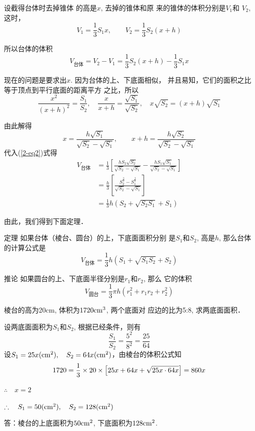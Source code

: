 设截得台体时去掉锥体
的高是$x$, 去掉的锥体和原
来的锥体的体积分别是$V_1$和
$V_2$, 这时，
\[V_1=\frac{1}{3}S_1 x,\qquad V_2=\frac{1}{3}S_2(x+h)\]

所以台体的体积
\begin{equation}\label{2-eq2}
    V_{\text{台体}}=V_2-V_1=\frac{1}{3}S_2(x+h)-\frac{1}{3}S_1x
\end{equation}

现在的问题是要求出$x$. 因为台体的上、下底面相似，
并且易知，它们的面积之比等于顶点到平行底面的距离平方
之比，所以
\[\frac{x^2}{(x+h)^2}=\frac{S_1}{S_2},\quad \frac{x}{x+h}=\frac{\sqrt{S_1}}{\sqrt{S_2}},\quad x\sqrt{S_2}=(x+h)\sqrt{S_1}\]

由此解得
\[x=\frac{h\sqrt{S_1}}{\sqrt{S_2}-\sqrt{S_1}},\qquad x+h=\frac{h\sqrt{S_2}}{\sqrt{S_2}-\sqrt{S_1}}\]
代入(\ref{2-eq2})式得
\[\begin{split}
    V_{\text{台体}}&=\frac{1}{3}\left[\frac{hS_2\sqrt{S_2}}{\sqrt{S_2}-\sqrt{S_1}}-\frac{hS_1\sqrt{S_1}}{\sqrt{S_2}-\sqrt{S_1}}\right]\\
    &=\frac{h}{3}\left[\frac{S_2^{\tfrac{3}{2}}-S_1^{\tfrac{3}{2}}}{\sqrt{S_2}-\sqrt{S_1}}\right]\\
    &=\frac{1}{3}h\left(S_2+\sqrt{S_2S_1}+S_1\right)
\end{split}\]

由此，我们得到下面定理．

\begin{blk}
{定理} 如果台体（棱台、圆台）的上，下底面面积分别
是$S_1$和$S_2$, 高是$h$, 那么台体的计算公式是
\[V_{\text{台体}}=\frac{1}{3}h\left(S_1+\sqrt{S_1S_2}+S_2\right)\]    
\end{blk}

\begin{blk}
{推论} 如果圆台的上、下底面半径分别是$r_1$和$r_2$, 那么
它的体积 
\[V_{\text{圆台}}=\frac{1}{3}\pi h(r^2_1+r_1r_2+r^2_2)\] 
\end{blk}

\begin{example}
    棱台的高为20cm, 体积为$1720{\rm cm^3}$, 两个底面对
    应边的比为5:8, 求两底面面积．
\end{example}

\begin{solution}
    设两底面面积为$S_1$和$S_2$, 根据已经条件，则有
\[\frac{S_1}{S_2}=\frac{5^2}{8^2}=\frac{25}{64}\]   
    设$S_1=25x({\rm cm^2}),\quad S_2=64x({\rm cm^2})$，由棱台的体积公式知
\[    1720=\dfrac{1}{3}\times 20\times \left[25x+64x+\sqrt{25x\cdot 64x}\right]=860x\]

$\therefore\quad x=2$

$\therefore\quad S_1=50({\rm cm^2}),\quad S_2=128({\rm cm^2})$

答：棱台的上底面积为$50{\rm cm^2}$, 下底面积为$128{\rm cm^2}$.
\end{solution}

